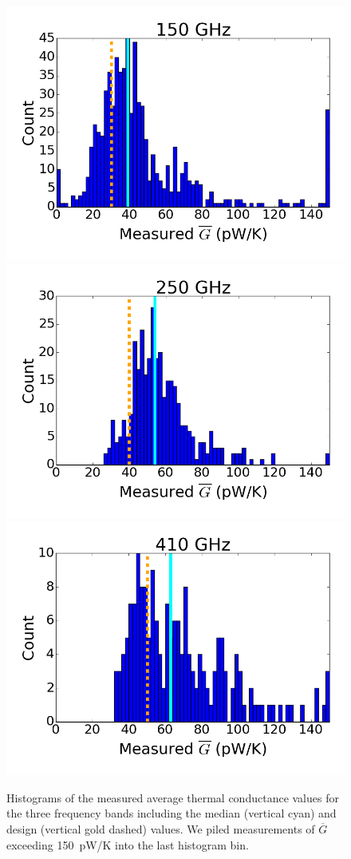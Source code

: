 \begin{figure}[ht!]
\centering
\includegraphics[width=0.32\columnwidth]{figures/150_g_bar_hist.png}
\includegraphics[width=0.32\columnwidth]{figures/250_g_bar_hist.png}
\includegraphics[width=0.32\columnwidth]{figures/410_g_bar_hist.png}
\caption{Histograms of the measured average thermal conductance values for the three frequency bands including the 
median (vertical cyan) and design (vertical gold dashed) values. 
We piled measurements of  $\overline{G}$ exceeding 150~pW/K into the last histogram bin.
}
\label{fig:G_Histograms} 
\end{figure}





